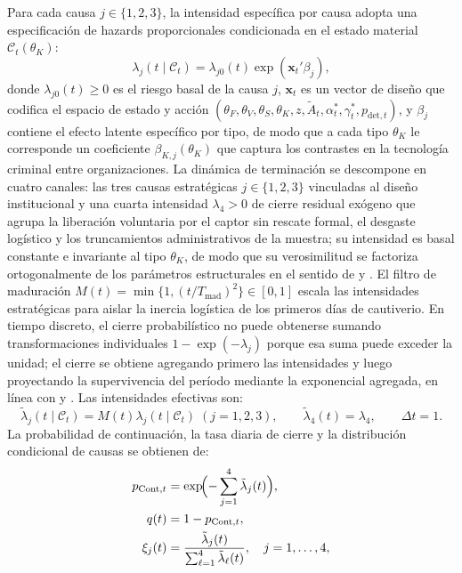 \documentclass[pdflatex,sn-mathphys-ay]{sn-jnl}
\theoremstyle{thmstyleone}
\theoremstyle{thmstyletwo}
\theoremstyle{thmstylethree}
\newcommand{\1}{\mathbf{1}}
\begin{document}
Para cada causa $j\in\{1,2,3\}$, la intensidad específica por causa adopta una especificación de hazards proporcionales condicionada en el estado material $\mathcal{C}_t(\theta_K)$:
\begin{equation}
\lambda_j(t\mid\mathcal{C}_t)=\lambda_{j0}(t)\exp(\mathbf{x}_t'\beta_j),
\label{eq:lambda-j}
\end{equation}
donde $\lambda_{j0}(t)\ge 0$ es el riesgo basal de la causa $j$, $\mathbf{x}_t$ es un vector de diseño que codifica el espacio de estado y acción $(\theta_F,\theta_V,\theta_S,\theta_K,z,\tilde{A}_t,\alpha_t^\ast,\gamma_t^\ast,p_{\mathrm{det},t})$, y $\beta_j$ contiene el efecto latente específico por tipo, de modo que a cada tipo $\theta_K$ le corresponde un coeficiente $\beta_{K,j}(\theta_K)$ que captura los contrastes en la tecnología criminal entre organizaciones. La dinámica de terminación se descompone en cuatro canales: las tres causas estratégicas $j\in\{1,2,3\}$ vinculadas al diseño institucional y una cuarta intensidad $\lambda_4>0$ de cierre residual exógeno que agrupa la liberación voluntaria por el captor sin rescate formal, el desgaste logístico y los truncamientos administrativos de la muestra; su intensidad es basal constante e invariante al tipo $\theta_K$, de modo que su verosimilitud se factoriza ortogonalmente de los parámetros estructurales en el sentido de \citet{Lancaster1990} y \citet{AbbringVanDenBerg2003}. El filtro de maduración $M(t)=\min\{1,(t/T_{\mathrm{mad}})^2\}\in[0,1]$ escala las intensidades estratégicas para aislar la inercia logística de los primeros días de cautiverio. En tiempo discreto, el cierre probabilístico no puede obtenerse sumando transformaciones individuales $1-\exp(-\lambda_j)$ porque esa suma puede exceder la unidad; el cierre se obtiene agregando primero las intensidades y luego proyectando la supervivencia del período mediante la exponencial agregada, en línea con \citet{Sueyoshi1992} y \citet{Wooldridge2010}. Las intensidades efectivas son:
\begin{equation}
\tilde{\lambda}_j(t\mid\mathcal{C}_t)=M(t)\lambda_j(t\mid\mathcal{C}_t)\;(j=1,2,3),\qquad\tilde{\lambda}_4(t)=\lambda_4,\qquad\Delta t=1.
\label{eq:hj}
\end{equation}
La probabilidad de continuación, la tasa diaria de cierre y la distribución condicional de causas se obtienen de:
\begin{align}
p_{\mathrm{Cont},t} &= \exp\!\Bigl(-\sum_{j=1}^{4}\tilde{\lambda}_j(t)\Bigr),\label{eq:pCont}\\
q(t) &= 1-p_{\mathrm{Cont},t},\label{eq:q}\\
\xi_j(t) &= \frac{\tilde{\lambda}_j(t)}{\sum_{\ell=1}^{4}\tilde{\lambda}_\ell(t)},\quad j=1,\ldots,4,\label{eq:xi}
\end{align}
\end{document}
